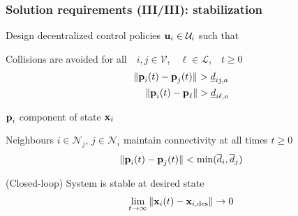 \begin{frame} %
  \frametitle{Solution requirements (III/III): stabilization}

  Design decentralized control policies $\bm{\mathbf{u}}_i \in \mathcal{U}_i$ such that\\[3ex]

  \begin{wideitemize}

    \item Collisions are avoided for all\ \ $i,j \in \mathcal{V}$,\ \ $\ell \in \mathcal{L}$,\ \ $t \geq 0$
      \begin{align}
        \|\bm{\mathbf{p}}_i(t) - \bm{\mathbf{p}}_{j}(t)\| > \underline{d}_{ij,a} \\
        \|\bm{\mathbf{p}}_i(t) - \bm{\mathbf{p}}_\ell\| > \underline{d}_{i\ell,o}
      \end{align}

      $\bm{\mathbf{p}}_i$ component of state $\bm{\mathbf{x}}_i$\\[3ex]

    \item Neighbours $i \in \mathcal{N}_j$, $j \in \mathcal{N}_i$
      maintain connectivity at all times $t \geq 0$
      \begin{align}
        \|\bm{\mathbf{p}}_i(t) - \bm{\mathbf{p}}_{j}(t)\| < \text{min}(\overline{d}_{i}, \overline{d}_{j})
      \end{align}

  \end{wideitemize}

  \begin{gg_box}
  \begin{wideitemize}
    \item (Closed-loop) System is stable at desired state
      \begin{align}
        \lim\limits_{t \to \infty}\|\bm{\mathbf{x}}_i(t) - \bm{\mathbf{x}}_{i,\text{des}}\| \to 0 \\
      \end{align}
  \end{wideitemize}

  \end{gg_box}

\end{frame} %
